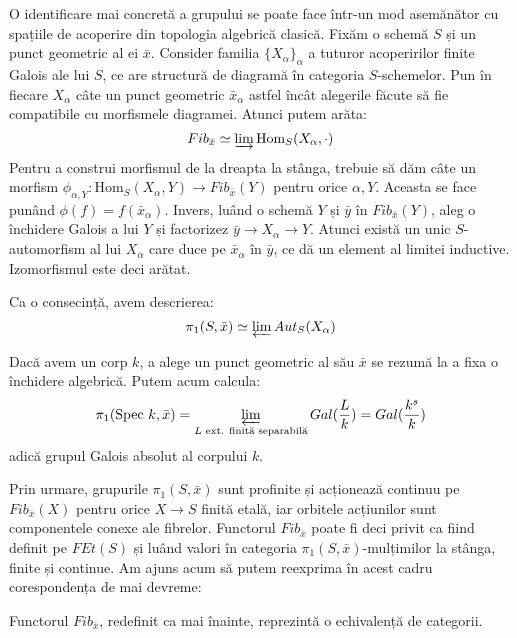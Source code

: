 \documentclass[13pt,openany]{book}
\begin{document}
O identificare mai concretă a grupului se poate face într-un mod asemănător cu spațiile de acoperire din topologia algebrică clasică. Fixăm o schemă $S$ și un punct geometric al ei $\bar{x}$. Consider familia $\{X_\alpha\}_\alpha$ a tuturor acoperirilor finite Galois ale lui $S$, ce are structură de diagramă în categoria $S$-schemelor. Pun în fiecare $X_\alpha$ câte un punct geometric $\bar{x}_\alpha$ astfel încât alegerile făcute să fie compatibile cu morfismele diagramei. Atunci putem arăta:
$$Fib_{\bar{x}} \simeq \varinjlim \text{Hom}_S(X_\alpha,\cdot)$$
Pentru a construi morfismul de la dreapta la stânga, trebuie să dăm câte un morfism $\phi_{\alpha,Y} : \text{Hom}_S(X_\alpha,Y) \rightarrow Fib_{\bar{x}}(Y)$ pentru orice $\alpha,Y$. Aceasta se face punând $\phi(f)=f(\bar{x}_\alpha)$. Invers, luând o schemă $Y$ și $\bar{y}$ în $Fib_{\bar{x}}(Y)$, aleg o închidere Galois a lui $Y$ și factorizez $\bar{y} \rightarrow X_\alpha \rightarrow Y$. Atunci există un unic $S$-automorfism al lui $X_\alpha$ care duce pe $\bar{x}_\alpha$ în $\bar{y}$, ce dă un element al limitei inductive. Izomorfismul este deci arătat.

Ca o consecință, avem descrierea:
$$\pi_1(S,\bar{x}) \simeq \varprojlim Aut_S(X_\alpha)$$

\begin{ex}
Dacă avem un corp $k$, a alege un punct geometric al său $\bar{x}$ se rezumă la a fixa o închidere algebrică. Putem acum calcula:
$$\pi_1(\text{Spec }k,\bar{x})=\varprojlim\limits_{L \text{ ext. finită separabilă}} Gal(\frac{L}{k}) = Gal(\frac{k^s}{k})$$
adică grupul Galois absolut al corpului $k$.
\end{ex}

Prin urmare, grupurile $\pi_1(S,\bar{x})$ sunt profinite și acționează continuu pe $Fib_{\bar{x}}(X)$ pentru orice $X \rightarrow S$ finită etală, iar orbitele acțiunilor sunt componentele conexe ale fibrelor. Functorul $Fib_{\bar{x}}$ poate fi deci privit ca fiind definit pe $FEt(S)$ și luând valori în categoria $\pi_1(S,\bar{x})$-mulțimilor la stânga, finite și continue. Am ajuns acum să putem reexprima în acest cadru corespondența de mai devreme:

\begin{teo}
Functorul $Fib_{\bar{x}}$, redefinit ca mai înainte, reprezintă o echivalență de categorii.
\end{teo}
\end{document}
